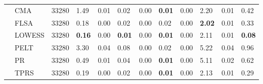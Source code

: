 \begin{table}[ht]
\begin{tabular}{llrlrlrlrlrl}
   & CMA & 33280 & 1.49 & 0.01 & 0.02 & 0.00 & \textbf{0.01} & 0.00 & 2.20 & 0.01 & 0.42 \\ 
   & FLSA & 33280 & 0.18 & 0.00 & 0.02 & 0.00 & 0.02 & 0.00 & \textbf{2.02} & 0.01 & 0.33 \\ 
   & LOWESS & 33280 & \textbf{0.16} & 0.00 & \textbf{0.01} & 0.00 & \textbf{0.01} & 0.00 & 2.11 & 0.01 & \textbf{0.08} \\ 
   & PELT & 33280 & 3.30 & 0.04 & 0.08 & 0.00 & 0.02 & 0.00 & 5.22 & 0.04 & 0.96 \\ 
   & PR & 33280 & 0.49 & 0.01 & 0.04 & 0.00 & \textbf{0.01} & 0.00 & 5.11 & 0.02 & 0.62 \\ 
   & TPRS & 33280 & 0.19 & 0.00 & 0.02 & 0.00 & \textbf{0.01} & 0.00 & 2.13 & 0.01 & 0.29 \\ 
   \bottomrule
\end{tabular}
\end{table}
